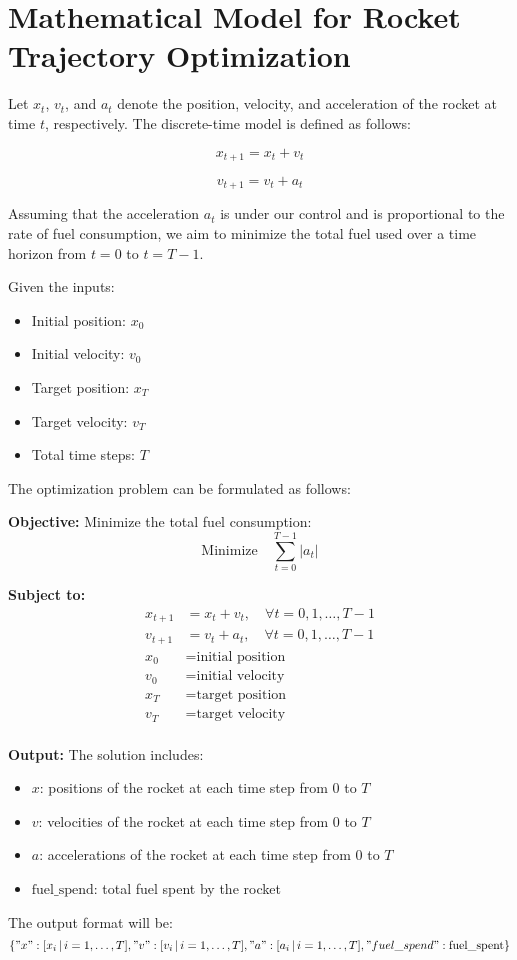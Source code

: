 \documentclass{article}
\begin{document}
\section*{Mathematical Model for Rocket Trajectory Optimization}

Let \( x_t \), \( v_t \), and \( a_t \) denote the position, velocity, and acceleration of the rocket at time \( t \), respectively. The discrete-time model is defined as follows:

\[
x_{t+1} = x_t + v_t
\]

\[
v_{t+1} = v_t + a_t
\]

Assuming that the acceleration \( a_t \) is under our control and is proportional to the rate of fuel consumption, we aim to minimize the total fuel used over a time horizon from \( t = 0 \) to \( t = T-1 \). 

Given the inputs:
\begin{itemize}
    \item Initial position: \( x_0 \)
    \item Initial velocity: \( v_0 \)
    \item Target position: \( x_T \)
    \item Target velocity: \( v_T \)
    \item Total time steps: \( T \)
\end{itemize}

The optimization problem can be formulated as follows:

\textbf{Objective:}
Minimize the total fuel consumption:
\[
\text{Minimize} \quad \sum_{t=0}^{T-1} |a_t|
\]

\textbf{Subject to:}
\begin{align*}
x_{t+1} &= x_t + v_t, \quad \forall t = 0, 1, \ldots, T-1 \\
v_{t+1} &= v_t + a_t, \quad \forall t = 0, 1, \ldots, T-1 \\
x_0 &= \text{initial position} \\
v_0 &= \text{initial velocity} \\
x_T &= \text{target position} \\
v_T &= \text{target velocity} \\
\end{align*}

\textbf{Output:}
The solution includes:
\begin{itemize}
    \item \( x \): positions of the rocket at each time step from \( 0 \) to \( T \)
    \item \( v \): velocities of the rocket at each time step from \( 0 \) to \( T \)
    \item \( a \): accelerations of the rocket at each time step from \( 0 \) to \( T \)
    \item \( \text{fuel\_spend} \): total fuel spent by the rocket
\end{itemize}

The output format will be:
\[
\{ 
    "x": [x_i \, | \, i = 1, \ldots, T], 
    "v": [v_i \, | \, i = 1, \ldots, T], 
    "a": [a_i \, | \, i = 1, \ldots, T], 
    "fuel\_spend": \text{fuel\_spent} 
\}
\]
\end{document}
